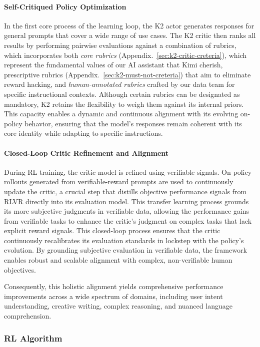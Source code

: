 \paragraph{Self-Critiqued Policy Optimization}
In the first core process of the learning loop, the K2 actor generates responses for general prompts that cover a wide range of use cases. The K2 critic then ranks all results by performing pairwise evaluations against a combination of rubrics, which incorporates both \textit{core rubrics} (Appendix.~\ref{sec:k2-critic-creteria}), which represent the fundamental values of our AI assistant that Kimi cherish, prescriptive rubrics (Appendix.~\ref{sec:k2-must-not-creteria}) that aim to eliminate reward hacking, and \textit{human-annotated rubrics} crafted by our data team for specific instructional contexts. Although certain rubrics can be designated as mandatory, K2 retains the flexibility to weigh them against its internal priors. This capacity enables a dynamic and continuous alignment with its evolving on-policy behavior, ensuring that the model's responses remain coherent with its core identity while adapting to specific instructions.

\paragraph{Closed-Loop Critic Refinement and Alignment}
During RL training, the critic model is refined using verifiable signals. On-policy rollouts generated from verifiable-reward prompts are used to continuously update the critic, a crucial step that distills objective performance signals from RLVR directly into its evaluation model. This transfer learning process grounds its more subjective judgments in verifiable data, allowing the performance gains from verifiable tasks to enhance the critic's judgment on complex tasks that lack explicit reward signals. 
This closed-loop process ensures that the critic continuously recalibrates its evaluation standards in lockstep with the policy's evolution. By grounding subjective evaluation in verifiable data, the framework enables robust and scalable alignment with complex, non-verifiable human objectives. 

Consequently, this holistic alignment yields comprehensive performance improvements across a wide spectrum of domains, including user intent understanding, creative writing, complex reasoning, and nuanced language comprehension.

\subsubsection{RL Algorithm}

